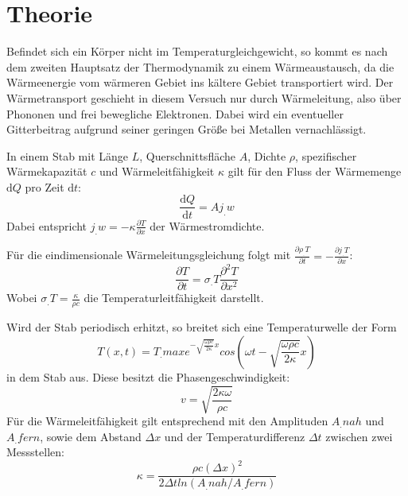 
\section{Theorie}
\label{sec:Theorie}

Befindet sich ein Körper nicht im Temperaturgleichgewicht, so kommt es nach dem zweiten Hauptsatz der Thermodynamik zu einem Wärmeaustausch, da die Wärmeenergie vom wärmeren Gebiet ins kältere Gebiet transportiert wird. Der Wärmetransport geschieht in diesem Versuch nur durch Wärmeleitung, also über Phononen und frei bewegliche Elektronen. Dabei wird ein eventueller Gitterbeitrag aufgrund seiner geringen Größe bei Metallen vernachlässigt.

In einem Stab mit Länge $L$, Querschnittsfläche $A$, Dichte $\rho$, spezifischer Wärmekapazität $c$ und Wärmeleitfähigkeit $\kappa$ gilt für den Fluss der Wärmemenge $\mathrm{d}Q$ pro Zeit $\mathrm{d}t$:
\begin{equation}
\frac{\mathrm{d}Q}{\mathrm{d}t} = A j_.w \label{eq:dQ/dt}
\end{equation}    
Dabei entspricht $j_.w = -\kappa \frac{\partial T}{\partial x}$ der Wärmestromdichte. 

Für die eindimensionale Wärmeleitungsgleichung folgt mit $\frac{\partial \rho_.T}{\partial t} = -\frac{\partial j_.T}{\partial x}$:
\begin{equation}
\frac{\partial T}{\partial t} = \sigma_.T \frac{\partial^2 T}{\partial x^2} \label{eq:T/t}
\end{equation}
Wobei $\sigma_.T = \frac{\kappa}{\rho c}$ die Temperaturleitfähigkeit darstellt.

Wird der Stab periodisch erhitzt, so breitet sich eine Temperaturwelle der Form
\begin{equation}
T(x, t) = T_.{max} e^{-\sqrt{\frac{\omega\rho c}{2\kappa}} x}cos\left(\omega t-\sqrt{\frac{\omega\rho c}{2\kappa}}x\right) \label{eq:T}
\end{equation}
in dem Stab aus. Diese besitzt die Phasengeschwindigkeit:
\begin{equation}
v = \sqrt{\frac{2\kappa\omega}{\rho c}} \label{eq:v}
\end{equation}
Für die Wärmeleitfähigkeit gilt entsprechend mit den Amplituden $A_.{nah}$ und $A_.{fern}$, sowie dem Abstand $\Delta x$ und der Temperaturdifferenz $\Delta t$  zwischen zwei Messstellen: 
\begin{equation}
\kappa = \frac{\rho c(\Delta x)^2}{2\Delta t ln(A_.{nah}/A_.{fern})} \label{eq:k}
\end{equation}
